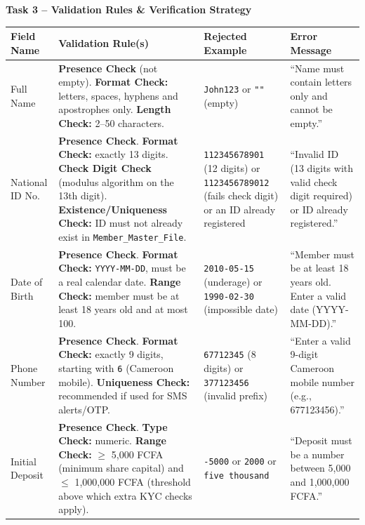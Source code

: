 \documentclass[11pt]{article}
\begin{document}
\medskip
\noindent\textbf{Task 3 -- Validation Rules \& Verification Strategy}

\begin{center}
\small
\begin{tabularx}{\linewidth}{|l|X|X|X|}
\hline
\rowcolor{popblueL}
\textbf{Field Name} & \textbf{Validation Rule(s)} & \textbf{Rejected Example} & \textbf{Error Message} \\
\hline
Full Name & \textbf{Presence Check} (not empty). \textbf{Format Check:} letters, spaces, hyphens and apostrophes only. \textbf{Length Check:} 2--50 characters. & \texttt{John123} or \texttt{""} (empty) & ``Name must contain letters only and cannot be empty.'' \\
\hline
National ID No. & \textbf{Presence Check}. \textbf{Format Check:} exactly 13 digits. \textbf{Check Digit Check} (modulus algorithm on the 13th digit). \textbf{Existence/Uniqueness Check:} ID must not already exist in \texttt{Member\_Master\_File}. & \texttt{112345678901} (12 digits) or \texttt{1123456789012} (fails check digit) or an ID already registered & ``Invalid ID (13 digits with valid check digit required) or ID already registered.'' \\
\hline
Date of Birth & \textbf{Presence Check}. \textbf{Format Check:} \texttt{YYYY-MM-DD}, must be a real calendar date. \textbf{Range Check:} member must be at least 18 years old and at most 100. & \texttt{2010-05-15} (underage) or \texttt{1990-02-30} (impossible date) & ``Member must be at least 18 years old. Enter a valid date (YYYY-MM-DD).'' \\
\hline
Phone Number & \textbf{Presence Check}. \textbf{Format Check:} exactly 9 digits, starting with \texttt{6} (Cameroon mobile). \textbf{Uniqueness Check:} recommended if used for SMS alerts/OTP. & \texttt{67712345} (8 digits) or \texttt{377123456} (invalid prefix) & ``Enter a valid 9-digit Cameroon mobile number (e.g., 677123456).'' \\
\hline
Initial Deposit & \textbf{Presence Check}. \textbf{Type Check:} numeric. \textbf{Range Check:} $\ge$ 5,000 FCFA (minimum share capital) and $\le$ 1,000,000 FCFA (threshold above which extra KYC checks apply). & \texttt{-5000} or \texttt{2000} or \texttt{five thousand} & ``Deposit must be a number between 5,000 and 1,000,000 FCFA.'' \\
\hline
\end{tabularx}
\end{center}
\end{document}
